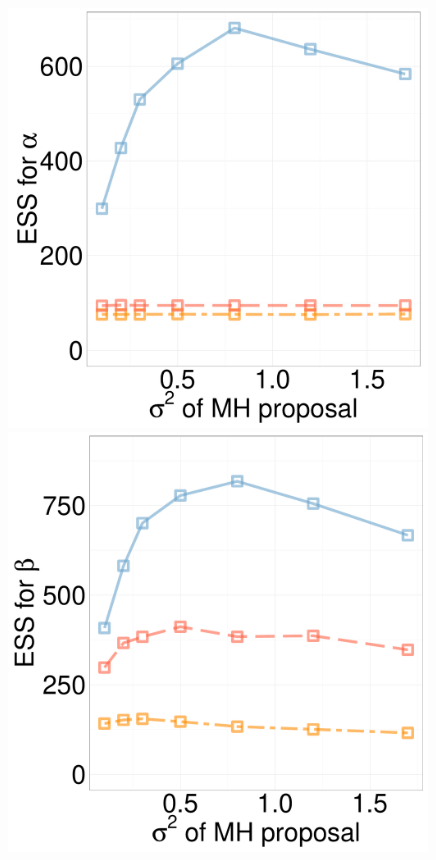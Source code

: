\begin{figure}[H]
\begin{minipage}[hp]{0.24\linewidth}
	\end{minipage}
  \begin{minipage}[hp]{0.24\linewidth}
  \centering
    \includegraphics [width=0.99\textwidth, angle=0]{figs/ess/EXP_D10alpha_k2.pdf}
	\end{minipage}
  \begin{minipage}[hp]{0.24\linewidth}
  \centering
    \includegraphics [width=0.99\textwidth, angle=0]{figs/ess/EXP_D10beta_k2.pdf}

\end{minipage}
\end{figure}
